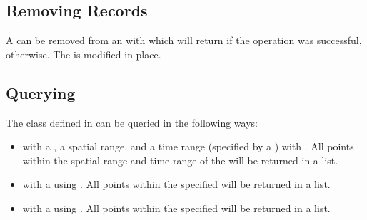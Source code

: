 \documentclass[letterpaper,10pt,english]{sphinxmanual}
\begin{document}
\subsection{Removing Records}
\label{\detokenize{octtree:removing-records}}
\sphinxAtStartPar
A  can be removed from an  with  which will return  if the operation
was successful,  otherwise. The  is modified in place.


\subsection{Querying}
\label{\detokenize{octtree:querying}}
\sphinxAtStartPar
The  class defined in  can be queried in the following ways:
\begin{itemize}
\item {} 
\sphinxAtStartPar
with a , a spatial range, and a time range (specified by a ) with
. All points within the spatial range and time range of the  will be
returned in a list.

\item {} 
\sphinxAtStartPar
with a  using . All points within the specified  will be returned in a list.

\item {} 
\sphinxAtStartPar
with a  using . All points within the specified  will be returned in a list.

\end{itemize}
\end{document}
